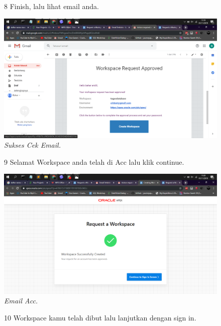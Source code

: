 \begin{enumerate}
\begin{figure}
\item[8] Finish, lalu lihat email anda.

    \begin{center}
\includegraphics[scale=0.2]{figures/7.png}
    \caption{\textit{Sukses Cek Email.}}
        \end{center}
\label{gambar}
\end{figure}

\begin{figure}
\item[9] Selamat Workspace anda telah di Acc lalu klik continue.

    \begin{center}
\includegraphics[scale=0.2]{figures/8.png}
    \caption{\textit{Email Acc.}}
        \end{center}
\label{gambar}
\end{figure}

\begin{figure}
\item[10] Workspace kamu telah dibut lalu lanjutkan dengan sign in.
\label{gambar}
\end{figure}


\end{enumerate}

